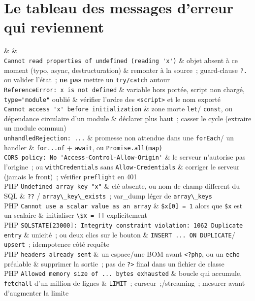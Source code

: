 \section{Le tableau des messages d'erreur qui reviennent}

\begin{tablez}
  \headrow {} \&  \&  \\
  \midrule
  \verb|Cannot read properties of undefined (reading 'x')| \& objet absent \`a ce moment (typo, async, destructuration) \& remonter \`a la source~; guard-clause \verb|?.| ou valider l'\'etat~; \textbf{ne pas} mettre un \verb|try/catch| autour \\
  \verb|ReferenceError: x is not defined| \& variable hors port\'ee, script non charg\'e, \verb|type="module"| oubli\'e \& v\'erifier l'ordre des \verb|<script>| et le nom export\'e \\
  \verb|Cannot access 'x' before initialization| \& zone morte \verb|let|/ \verb|const|, ou d\'ependance circulaire d'un module \& d\'eclarer plus haut~; casser le cycle (extraire un module commun) \\
  \verb|unhandledRejection: ...| \& promesse non attendue dans une \verb|forEach|/ un handler \& \verb|for...of| + \verb|await|, ou \verb|Promise.all(map)| \\
  \verb|CORS policy: No 'Access-Control-Allow-Origin'| \& le serveur n'autorise pas l'origine~; ou \verb|withCredentials| sans \verb|Allow-Credentials| \& corriger le serveur (jamais le front)~; v\'erifier \verb|preflight| en 401 \\
  PHP \verb|Undefined array key "x"| \& cl\'e absente, ou nom de champ different du SQL \& \verb|??| / \verb|array\_key\_exists|~; var\_dump l\'eger de \verb|array\_keys| \\
  PHP \verb|Cannot use a scalar value as an array| \& \verb|$x[0] = 1| alors que \verb|$x| est un scalaire \& initialiser \verb|\$x = []| explicitement \\
  PHP \verb|SQLSTATE[23000]: Integrity constraint violation: 1062 Duplicate entry| \& unicit\'e~; ou deux clics sur le bouton \& \verb|INSERT ... ON DUPLICATE|/ \verb|upsert|~; idempotence c\^ot\'e requ\^ete \\
  PHP \verb|headers already sent| \& un espace/une BOM avant \verb|<?php|, ou un \verb|echo| pr\'ealable \& supprimer la sortie~; pas de \verb|?>| final dans un fichier de classe \\
  PHP \verb|Allowed memory size of ... bytes exhausted| \& boucle qui accumule, \verb|fetchall| d'un million de lignes \& \verb|LIMIT|~; curseur~;/streaming~; mesurer avant d'augmenter la limite \\

\end{tablez}

